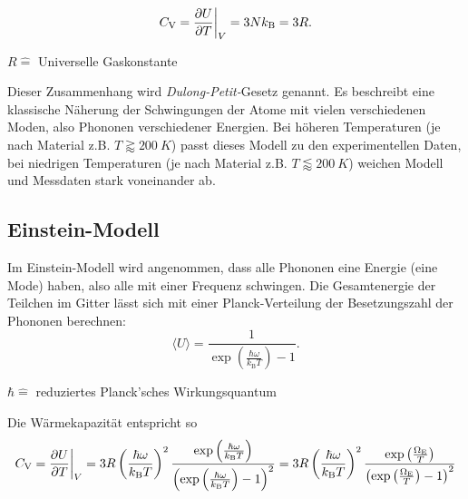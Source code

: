 \begin{equation*}
	C_{\text{V}} = \frac{\partial U}{\partial T} \bigg{\vert}_{V} = 3 N k_{\text{B}} = 3 R.
\end{equation*}
\begin{center}
	\tiny{$R \widehat{=}$ Universelle Gaskonstante}
\end{center}
Dieser Zusammenhang wird \textit{Dulong-Petit-}Gesetz genannt.
Es beschreibt eine klassische Näherung der Schwingungen der Atome mit vielen verschiedenen Moden, also Phononen verschiedener Energien.
Bei höheren Temperaturen (je nach Material z.B. $T \gtrapprox \SI{200}{K}$) passt dieses Modell zu den experimentellen Daten, bei niedrigen Temperaturen (je nach Material z.B. $T \lessapprox \SI{200}{K}$) weichen Modell und Messdaten stark voneinander ab.

\FloatBarrier
\subsection{Einstein-Modell}
Im Einstein-Modell wird angenommen, dass alle Phononen eine Energie (eine Mode) haben, also alle mit einer Frequenz schwingen.
Die Gesamtenergie der Teilchen im Gitter lässt sich mit einer Planck-Verteilung der Besetzungszahl der Phononen berechnen:
\begin{equation*}
	\langle U \rangle = \frac{1}{\exp{\left( \frac{ \hbar \omega }{ k_{\text{B}} T } \right)} - 1}.
\end{equation*}
\begin{center}
	\tiny{$\hbar \widehat{=}$ reduziertes Planck'sches Wirkungsquantum}
\end{center}

Die Wärmekapazität entspricht so
\begin{equation*}
	C_{\text{V}} = \frac{\partial U}{\partial T} \bigg{\vert}_{V} = 3 R \left( \frac{\hbar \omega}{k_{\text{B}} T} \right)^2
	\frac{ \exp{\left( \frac{ \hbar \omega }{ k_{\text{B}} T } \right)} }{ \left( \exp{\left( \frac{ \hbar \omega }{ k_{\text{B}} T } \right)} - 1 \right)^2 } =
	3 R \left( \frac{\hbar \omega}{k_{\text{B}} T} \right)^2
	\frac{ \exp{\left( \frac{ \Omega_{\text{E}} }{ T } \right)} }{ \left( \exp{\left( \frac{ \Omega_{\text{E}} }{ T } \right)} - 1 \right)^2 }
\end{equation*}
